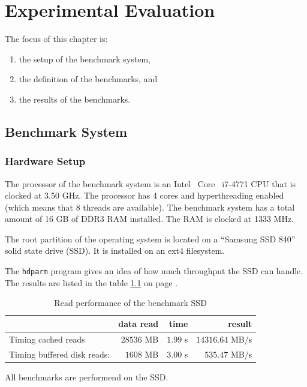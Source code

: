 \chapter{Experimental Evaluation}

The focus of this chapter is:
\begin{enumerate}
\item the setup of the benchmark system,
\item the definition of the benchmarks, and
\item the results of the benchmarks.
\end{enumerate}

\section{Benchmark System}
  \subsection{Hardware Setup}

The processor of the benchmark system is an Intel\textregistered~ Core\texttrademark~ i7-4771 CPU that is clocked at 3.50 GHz.
The processor has 4 cores and hyperthreading enabled (which means that 8 threads are available).
The benchmark system has a total amount of 16 GB of DDR3 RAM installed.
The RAM is clocked at 1333 MHz.

The root partition of the operating system is located on a ``Samsung SSD 840'' solid state drive (SSD).
It is installed on an ext4 filesystem.

The \texttt{hdparm} program gives an idea of how much throughput the SSD can handle. The results are listed in the table \ref{eval-ssd} on page \pageref{eval-ssd}.

\begin{table}[h]
\centering
\caption{Read performance of the benchmark SSD}
\label{eval-ssd}
\begin{tabular}{lrrr}
\textbf{}                   & \textbf{data read} & \textbf{time} & \textbf{result} \\ \hline
Timing cached reads         & $28536$ MB         & $1.99$ s      & $14316.64$ MB/s \\
Timing buffered disk reads: & $1608$ MB          & $3.00$ s      & $535.47$ MB/s   \\ \hline
\end{tabular}
\end{table}

All benchmarks are performend on the SSD.

